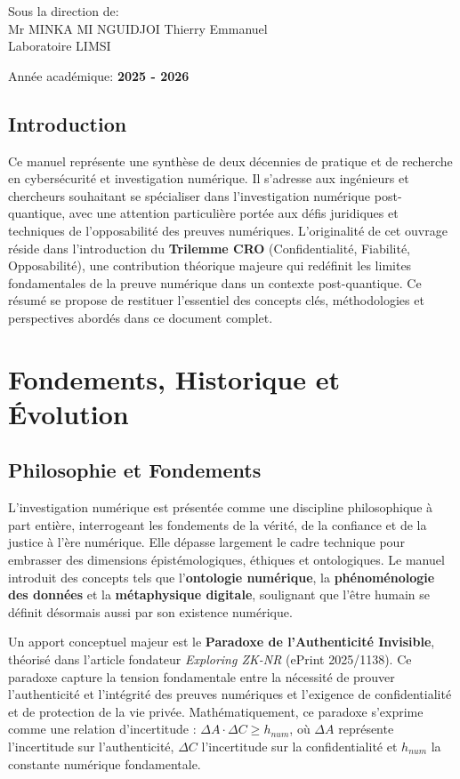 \documentclass[12pt, a4paper]{article}
\begin{document}
\begin{titlepage}
    {\large Sous la direction de:} \\
    {\large Mr MINKA MI NGUIDJOI Thierry Emmanuel} \\
    {\small Laboratoire LIMSI} \\
    \vspace{1cm}
    
    {\large Année académique: \textbf{2025 - 2026}} \\
\end{titlepage}

\subsection*{Introduction}
Ce manuel représente une synthèse de deux décennies de pratique et de recherche en cybersécurité et investigation numérique. Il s'adresse aux ingénieurs et chercheurs souhaitant se spécialiser dans l'investigation numérique post-quantique, avec une attention particulière portée aux défis juridiques et techniques de l'opposabilité des preuves numériques. L'originalité de cet ouvrage réside dans l'introduction du \textbf{Trilemme CRO} (Confidentialité, Fiabilité, Opposabilité), une contribution théorique majeure qui redéfinit les limites fondamentales de la preuve numérique dans un contexte post-quantique. Ce résumé se propose de restituer l'essentiel des concepts clés, méthodologies et perspectives abordés dans ce document complet.

\section{Fondements, Historique et Évolution}

\subsection{Philosophie et Fondements}
L'investigation numérique est présentée comme une discipline philosophique à part entière, interrogeant les fondements de la vérité, de la confiance et de la justice à l'ère numérique. Elle dépasse largement le cadre technique pour embrasser des dimensions épistémologiques, éthiques et ontologiques. Le manuel introduit des concepts tels que l'\textbf{ontologie numérique}, la \textbf{phénoménologie des données} et la \textbf{métaphysique digitale}, soulignant que l'être humain se définit désormais aussi par son existence numérique.

Un apport conceptuel majeur est le \textbf{Paradoxe de l'Authenticité Invisible}, théorisé dans l'article fondateur \textit{Exploring ZK-NR} (ePrint 2025/1138). Ce paradoxe capture la tension fondamentale entre la nécessité de prouver l'authenticité et l'intégrité des preuves numériques et l'exigence de confidentialité et de protection de la vie privée. Mathématiquement, ce paradoxe s'exprime comme une relation d'incertitude : \(\Delta A \cdot \Delta C \geq h_{num}\), où \(\Delta A\) représente l'incertitude sur l'authenticité, \(\Delta C\) l'incertitude sur la confidentialité et \(h_{num}\) la constante numérique fondamentale.
\end{document}
